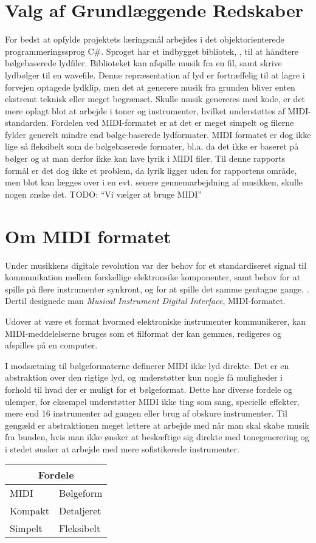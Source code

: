\section {Valg af Grundlæggende Redskaber}
For bedst at opfylde projektets læringsmål arbejdes i det objektorienterede programmeringssprog C#.
Sproget har et indbygget bibliotek, , til at håndtere bølgebaserede lydfiler. Biblioteket kan afspille musik fra en fil, samt skrive lydbølger til en wavefile. Denne repræsentation af lyd er fortræffelig til at lagre i forvejen optagede lydklip, men det at generere musik fra grunden bliver enten ekstremt teknisk eller meget begrænset.\todocite
Skulle musik genereres med kode, er det mere oplagt blot at arbejde i toner og instrumenter, hvilket understøttes af MIDI-standarden.  Fordelen ved MIDI-formatet er at det er meget simpelt og filerne fylder generelt mindre end bølge-baserede lydformater. MIDI formatet er dog ikke lige så fleksibelt som de bølgebaserede formater, bl.a. da det ikke er baseret på bølger og at man derfor ikke kan lave lyrik i MIDI filer. Til denne rapports formål er det dog ikke et problem, da lyrik ligger uden for rapportens område, men blot kan lægges over i en evt. senere gennemarbejdning af musikken, skulle nogen ønske det.
TODO: “Vi vælger at bruge MIDI”

\section {Om MIDI formatet}
Under musikkens digitale revolution var der behov for et standardiseret signal til kommunikation mellem forskellige elektronsike komponenter, samt behov for at spille på flere instrumenter synkront, og for at spille det samme gentagne gange. \cite{citation+needed}. Dertil designede man \emph{Musical Instrument Digital Interface}, MIDI-formatet.  
 
Udover at være et format hvormed elektroniske instrumenter kommunikerer, kan MIDI-meddelelserne bruges som et filformat der kan gemmes, redigeres og afspilles på en computer\cite{citation+needed}.

I modsætning til bølgeformaterne definerer MIDI ikke lyd direkte. Det er en abstraktion over den rigtige lyd, og understøtter kun nogle få muligheder i forhold til hvad der er muligt for et bølgeformat. 
Dette har diverse fordele og ulemper, for eksempel understøtter MIDI ikke ting som sang, specielle effekter, mere end 16 instrumenter ad gangen eller brug af obskure instrumenter. Til gengæld er abstraktionen meget lettere at arbejde med når man skal skabe musik fra bunden, hvis man ikke ønsker at beskæftige sig direkte med tonegenerering og i stedet ønsker at arbejde med mere sofistikerede instrumenter. 
\begin{center}
\begin{tabular}{ | l | l | }
	\hline
	\multicolumn{2}{|c|}{Fordele}\\ \hline
	MIDI 		& Bølgeform\\ \hline \hline
	Kompakt 	& Detaljeret\\ \hline
	Simpelt 	& Fleksibelt\\ \hline
\end{tabular}
\end{center}
